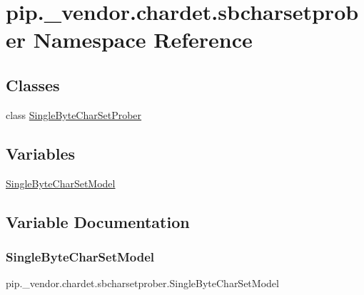 \hypertarget{namespacepip_1_1__vendor_1_1chardet_1_1sbcharsetprober}{}\section{pip.\+\_\+vendor.\+chardet.\+sbcharsetprober Namespace Reference}
\label{namespacepip_1_1__vendor_1_1chardet_1_1sbcharsetprober}
\subsection*{Classes}
\begin{DoxyCompactItemize}
\item 
class \hyperlink{classpip_1_1__vendor_1_1chardet_1_1sbcharsetprober_1_1SingleByteCharSetProber}{Single\+Byte\+Char\+Set\+Prober}
\end{DoxyCompactItemize}
\subsection*{Variables}
\begin{DoxyCompactItemize}
\item 
\hyperlink{namespacepip_1_1__vendor_1_1chardet_1_1sbcharsetprober_a68e94a2e1fdfe1dc67a04c2c40543158}{Single\+Byte\+Char\+Set\+Model}
\end{DoxyCompactItemize}


\subsection{Variable Documentation}
\mbox{\label{namespacepip_1_1__vendor_1_1chardet_1_1sbcharsetprober_a68e94a2e1fdfe1dc67a04c2c40543158}} 
\subsubsection{\texorpdfstring{Single\+Byte\+Char\+Set\+Model}{SingleByteCharSetModel}}
{\footnotesize\ttfamily pip.\+\_\+vendor.\+chardet.\+sbcharsetprober.\+Single\+Byte\+Char\+Set\+Model}

